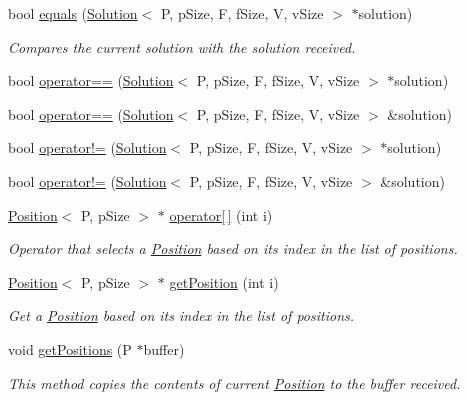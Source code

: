 \begin{DoxyCompactItemize}
\item 
bool \hyperlink{classSolution_a38c4ef92e86f28e3dbbc2a77afd356d4}{equals} (\hyperlink{classSolution}{Solution}$<$ P, p\+Size, F, f\+Size, V, v\+Size $>$ $\ast$solution)
\begin{DoxyCompactList}\small\item\em Compares the current solution with the solution received. \end{DoxyCompactList}\item 
bool \hyperlink{classSolution_a7681f8c7d0c20381203276c7b9a26374}{operator==} (\hyperlink{classSolution}{Solution}$<$ P, p\+Size, F, f\+Size, V, v\+Size $>$ $\ast$solution)
\item 
bool \hyperlink{classSolution_a861971bd3294c0389871abd13d2a9427}{operator==} (\hyperlink{classSolution}{Solution}$<$ P, p\+Size, F, f\+Size, V, v\+Size $>$ \&solution)
\item 
bool \hyperlink{classSolution_a4f0ac3c5f908538e65e4498d1061d156}{operator!=} (\hyperlink{classSolution}{Solution}$<$ P, p\+Size, F, f\+Size, V, v\+Size $>$ $\ast$solution)
\item 
bool \hyperlink{classSolution_a225d6e8e5470be0f3f8bb6abc1a16782}{operator!=} (\hyperlink{classSolution}{Solution}$<$ P, p\+Size, F, f\+Size, V, v\+Size $>$ \&solution)
\item 
\hyperlink{structPosition}{Position}$<$ P, p\+Size $>$ $\ast$ \hyperlink{classSolution_ad783c91ad12c21e861a4639e72c4fd50}{operator\mbox{[}$\,$\mbox{]}} (int i)
\begin{DoxyCompactList}\small\item\em Operator that selects a \hyperlink{structPosition}{Position} based on its index in the list of positions. \end{DoxyCompactList}\item 
\hyperlink{structPosition}{Position}$<$ P, p\+Size $>$ $\ast$ \hyperlink{classSolution_acddbe4cdda346908a7b46cde53af32b6}{get\+Position} (int i)
\begin{DoxyCompactList}\small\item\em Get a \hyperlink{structPosition}{Position} based on its index in the list of positions. \end{DoxyCompactList}\item 
void \hyperlink{classSolution_acaffcea4a5bfc0ad8ef8d655f56533b6}{get\+Positions} (P $\ast$buffer)
\begin{DoxyCompactList}\small\item\em This method copies the contents of current \hyperlink{structPosition}{Position} to the buffer received. \end{DoxyCompactList}\item 

\end{DoxyCompactItemize}
